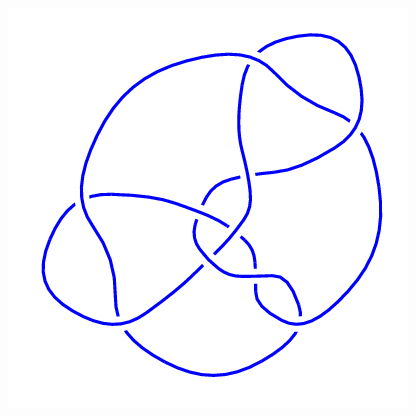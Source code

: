 \begin{figure}[H]
\begin{minipage}[b]{.18\linewidth}
    \end{minipage}
    \begin{minipage}[b]{.18\linewidth}
        \centering
        \includegraphics[width=\linewidth]{../data/10_161.png}
    \end{minipage}
\end{figure}
